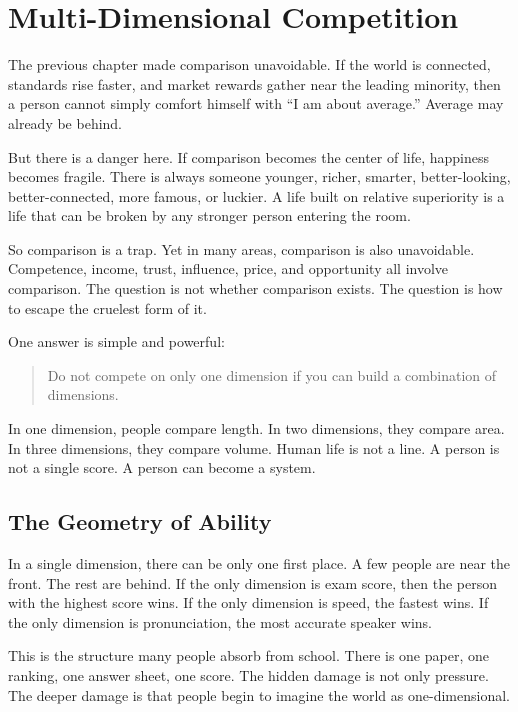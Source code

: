 \chapter{Multi-Dimensional Competition}

The previous chapter made comparison unavoidable. If the world is connected, standards rise faster, and market rewards gather near the leading minority, then a person cannot simply comfort himself with ``I am about average.'' Average may already be behind.

But there is a danger here. If comparison becomes the center of life, happiness becomes fragile. There is always someone younger, richer, smarter, better-looking, better-connected, more famous, or luckier. A life built on relative superiority is a life that can be broken by any stronger person entering the room.

So comparison is a trap. Yet in many areas, comparison is also unavoidable. Competence, income, trust, influence, price, and opportunity all involve comparison. The question is not whether comparison exists. The question is how to escape the cruelest form of it.

One answer is simple and powerful:

\begin{quote}
Do not compete on only one dimension if you can build a combination of dimensions.
\end{quote}

In one dimension, people compare length. In two dimensions, they compare area. In three dimensions, they compare volume. Human life is not a line. A person is not a single score. A person can become a system.

\section*{The Geometry of Ability}

In a single dimension, there can be only one first place. A few people are near the front. The rest are behind. If the only dimension is exam score, then the person with the highest score wins. If the only dimension is speed, the fastest wins. If the only dimension is pronunciation, the most accurate speaker wins.

This is the structure many people absorb from school. There is one paper, one ranking, one answer sheet, one score. The hidden damage is not only pressure. The deeper damage is that people begin to imagine the world as one-dimensional.

